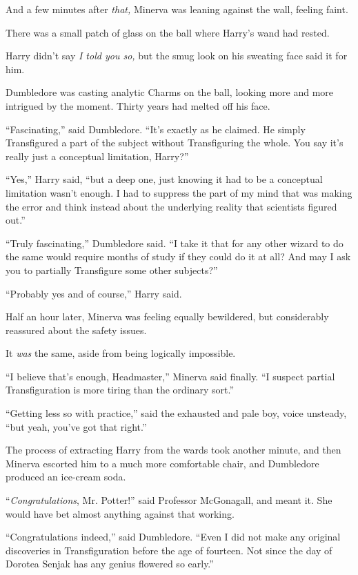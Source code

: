And a few minutes after \emph{that,} Minerva was leaning against the wall, feeling faint.

There was a small patch of glass on the ball where Harry's wand had rested.

Harry didn't say \emph{I told you so,} but the smug look on his sweating face said it for him.

Dumbledore was casting analytic Charms on the ball, looking more and more intrigued by the moment. Thirty years had melted off his face.

``Fascinating,'' said Dumbledore. ``It's exactly as he claimed. He simply Transfigured a part of the subject without Transfiguring the whole. You say it's really just a conceptual limitation, Harry?''

``Yes,'' Harry said, ``but a deep one, just knowing it had to be a conceptual limitation wasn't enough. I had to suppress the part of my mind that was making the error and think instead about the underlying reality that scientists figured out.''

``Truly fascinating,'' Dumbledore said. ``I take it that for any other wizard to do the same would require months of study if they could do it at all? And may I ask you to partially Transfigure some other subjects?''

``Probably yes and of course,'' Harry said.

Half an hour later, Minerva was feeling equally bewildered, but considerably reassured about the safety issues.

It \emph{was} the same, aside from being logically impossible.

``I believe that's enough, Headmaster,'' Minerva said finally. ``I suspect partial Transfiguration is more tiring than the ordinary sort.''

``Getting less so with practice,'' said the exhausted and pale boy, voice unsteady, ``but yeah, you've got that right.''

The process of extracting Harry from the wards took another minute, and then Minerva escorted him to a much more comfortable chair, and Dumbledore produced an ice-cream soda.

``\emph{Congratulations}, Mr. Potter!'' said Professor McGonagall, and meant it. She would have bet almost anything against that working.

``Congratulations indeed,'' said Dumbledore. ``Even I did not make any original discoveries in Transfiguration before the age of fourteen. Not since the day of Dorotea Senjak has any genius flowered so early.''

